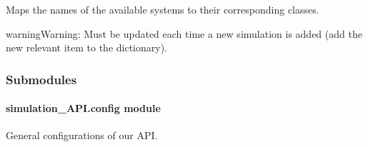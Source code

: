 \documentclass[a4paper,landscape,10pt,english]{sphinxmanual}
\begin{document}

\begin{fulllineitems}
\label{\detokenize{code_docs/simulation_API.simulation:simulation_API.simulation.simulations.Simulations}}
Maps the names of the available systems to their corresponding classes.

\begin{sphinxadmonition}{warning}{Warning:}
Must be updated each time a new simulation is added (add the new relevant item
to the dictionary).
\end{sphinxadmonition}

\end{fulllineitems}



\subsubsection{Submodules}
\label{\detokenize{code_docs/simulation_API:submodules}}

\paragraph{simulation\_API.config module}
\label{\detokenize{code_docs/simulation_API.config:module-simulation_API.config}}\label{\detokenize{code_docs/simulation_API.config:simulation-api-config-module}}\label{\detokenize{code_docs/simulation_API.config::doc}}
General configurations of our API.
\end{document}
